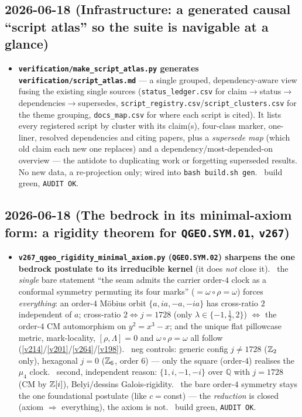 \subsection*{2026-06-18 (Infrastructure: a generated causal ``script atlas'' so the suite is navigable at a glance)}
\begin{itemize}
\item \textbf{\texttt{verification/make\_script\_atlas.py} generates \texttt{verification/script\_atlas.md}} ---
  a single grouped, dependency-aware view fusing the existing single sources (\texttt{status\_ledger.csv} for
  claim$\to$status$\to$dependencies$\to$supersedes, \texttt{script\_registry.csv}/\texttt{script\_clusters.csv}
  for the theme grouping, \texttt{docs\_map.csv} for where each script is cited). It lists every registered
  script by cluster with its claim(s), four-class marker, one-liner, resolved dependencies and citing papers,
  plus a \emph{supersede map} (which old claim each new one replaces) and a dependency/most-depended-on
  overview --- the antidote to duplicating work or forgetting superseded results. No new data, a re-projection
  only; wired into \texttt{bash build.sh gen}. \mE\ build green, \texttt{AUDIT OK}.
\end{itemize}

\subsection*{2026-06-18 (The bedrock in its minimal-axiom form: a rigidity theorem for \texttt{QGEO.SYM.01}, \texttt{v267})}
\begin{itemize}
\item \textbf{\texttt{v267\_qgeo\_rigidity\_minimal\_axiom.py} (\texttt{QGEO.SYM.02}) sharpens the one bedrock
  postulate to its irreducible kernel} (it does \emph{not} close it). \mE\ the \emph{single} bare statement
  ``the seam admits the carrier order-$4$ clock as a conformal symmetry permuting its four marks''
  ($=\omega\circ\rho=\omega$) forces \emph{everything}: an order-$4$ M\"obius orbit $\{a,ia,-a,-ia\}$ has
  cross-ratio $2$ independent of $a$; cross-ratio $2\Leftrightarrow j{=}1728$ (only $\lambda\in\{-1,\tfrac12,2\}$)
  $\Leftrightarrow$ the order-$4$ CM automorphism on $y^2{=}x^3{-}x$; and the unique flat pillowcase metric,
  mark-locality, $[\rho,\Lambda]{=}0$ and $\omega\circ\rho{=}\omega$ all follow (\vref{v214}/\vref{v201}/\vref{v264}/\vref{v198}).
  \mE\ neg controls: generic config $j\neq1728$ ($\mathbb{Z}_2$ only), hexagonal $j{=}0$ ($\mathbb{Z}_6$, order $6$) --- only
  the square (order-$4$) realises the $\mu_4$ clock. \mC\ second, independent reason: $\{1,i,-1,-i\}$ over
  $\mathbb Q$ with $j{=}1728$ (CM by $\mathbb{Z}[i]$), Belyi/dessins Galois-rigidity. \mO\ the bare order-$4$ symmetry stays
  the one foundational postulate (like $c{=}$const) --- the \emph{reduction} is closed (axiom $\Rightarrow$
  everything), the axiom is not. \mE\ build green, \texttt{AUDIT OK}.
\end{itemize}

